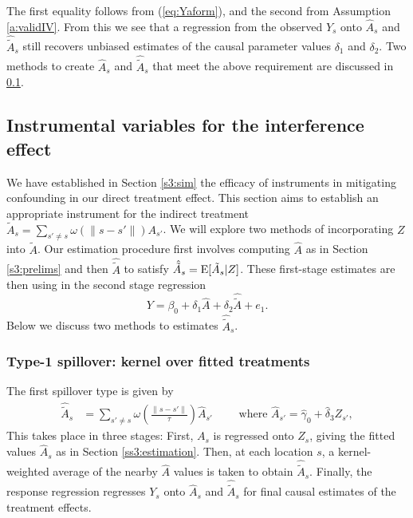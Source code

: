 \documentclass[12pt]{article}
\begin{document}
The first equality follows from (\ref{eq:Yaform}), and the second from Assumption \ref{a:validIV}. From this we see that a regression from the observed $Y_s$ onto $\hat{A}_s$ and $\hat{\tilde{A}}_s$ still recovers unbiased estimates of the causal parameter values $\delta_1$ and $\delta_2$. Two methods to create $\hat{A}_s$ and $\hat{\tilde{A}}_s$ that meet the above requirement are discussed in \ref{ss3:2sls}. 


\subsection{Instrumental variables for the interference effect} \label{ss3:2sls}

We have established in Section \ref{s3:sim} the efficacy of instruments in mitigating confounding in our direct treatment effect. This section aims to establish an appropriate instrument for the indirect treatment $\tilde{A}_s = \sum_{s' \ne s} \omega (\|s-s'\|)A_{s'}$. We will explore two methods of incorporating $Z$ into $\tilde{A}$. Our estimation procedure first involves computing $\hat{A}$ as in Section \ref{s3:prelims} and then $\hat{\tilde{A}}$ to satisfy $\hat{\tilde{A}}_s = \operatorname{E} [\tilde{A}_s | Z]$.  These first-stage estimates are then using in the second stage regression $$Y = \beta_0 + \delta_1 \hat{A} + \delta_2 \hat{\tilde{A}} + e_1.$$ Below we discuss two methods to estimates $\hat{\tilde{A}}_s$. 



\subsubsection{Type-1 spillover: kernel over fitted treatments} \label{type1spillover}
The first spillover type is given by
\begin{align*}
    \hat{\tilde{A}}_s &= 
    \sum_{s' \ne s }
    \omega \left( \frac{\| s-s' \|}{\tau} \right) \hat{A}_{s'} \qquad
    \text{ where } \hat{A}_{s'}= \hat{\gamma}_0 + \hat{\delta}_3 Z_{s'}, %
\end{align*}
This takes place in three stages: First, $A_s$ is regressed onto $Z_s$, giving the fitted values $\hat{A}_s$ as in Section \ref{ss3:estimation}.  Then, at each location $s$, a kernel-weighted average of the nearby $\hat{A}$ values is taken to obtain $\hat{\tilde{A}}_s$. Finally, the response regression regresses $Y_s$ onto $\hat{A}_s$ and $\hat{\tilde{A}}_s$ for final causal estimates of the treatment effects.
\end{document}

